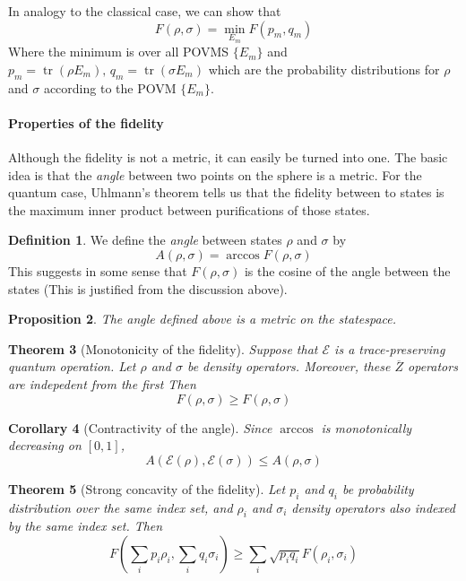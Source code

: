 \documentclass[11pt,a4paper]{article}
\theoremstyle{definition}
\newtheorem{definition}{Definition}[section]
\theoremstyle{plain}
\newtheorem{theorem}[definition]{Theorem}
\newtheorem{proposition}[definition]{Proposition}
\newtheorem{corollary}[definition]{Corollary}
\theoremstyle{remark}
\begin{document}
In analogy to the classical case, we can show that 
$$F(\rho, \sigma) = \min_{E_m} F(p_m, q_m)$$
Where the minimum is over all POVMS $\{E_m\}$ and $p_m = \operatorname{tr}(\rho E_m), \, q_m = \operatorname{tr}(\sigma E_m)$ which are the 
probability distributions for $\rho$ and $\sigma$ according to the POVM $\{E_m\}$. 

\paragraph{Properties of the fidelity} Although the fidelity is not a metric, it can easily be turned into one. 
The basic idea is that the \emph{angle} between two points on the sphere is a metric. For the quantum case, Uhlmann's theorem tells us that the 
fidelity between to states is the maximum inner product between purifications of those states. 

\begin{definition}
We define the \emph{angle} between states $\rho$ and $\sigma$ by 
$$A(\rho, \sigma) = \arccos F(\rho, \sigma)$$
This suggests in some sense that $F(\rho, \sigma)$ is the cosine of the angle between the states 
(This is justified from the discussion above). 
\end{definition}

\begin{proposition}
The angle defined above is a metric on the statespace. 
\end{proposition}

\begin{theorem}[Monotonicity of the fidelity]\label{thm:Monotonicity-fidelity}
Suppose that $\mathcal{E}$ is a trace-preserving quantum operation. Let $\rho$ and $\sigma$ be density operators. 
Moreover, these $\overline{Z}$ operators are indepedent from the first Then 
$$F(\mathcal{\rho}, \mathcal{\sigma}) \geq F(\rho, \sigma)$$
\end{theorem}

\begin{corollary}[Contractivity of the angle]\label{thm:contractivity-angle}
Since $\arccos$ is monotonically decreasing on $[0,1]$, 
$$A(\mathcal{E}(\rho), \mathcal{E}(\sigma)) \leq A(\rho, \sigma)$$
\end{corollary}

\begin{theorem}[Strong concavity of the fidelity]\label{thm:strong-concavity-fidelity}
Let $p_i$ and $q_i$ be probability distribution over the same index set, and $\rho_i$ and $\sigma_i$ density operators also indexed by the same index set. Then 
$$F \left(\sum_i p_i \rho_i, \sum_i q_i \sigma_i\right) \geq \sum_i \sqrt{p_i q_i} F(\rho_i, \sigma_i)$$
\end{theorem}
\end{document}
